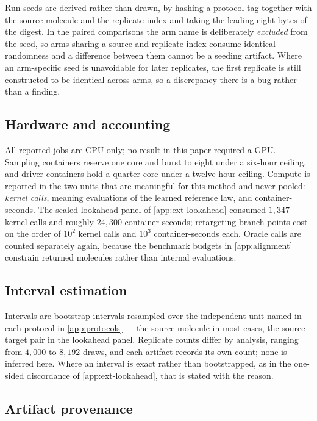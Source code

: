 Run seeds are derived rather than drawn, by hashing a protocol tag together with the source molecule and the replicate index and taking the leading eight bytes of the digest. In the paired comparisons the arm name is deliberately \emph{excluded} from the seed, so arms sharing a source and replicate index consume identical randomness and a difference between them cannot be a seeding artifact. Where an arm-specific seed is unavoidable for later replicates, the first replicate is still constructed to be identical across arms, so a discrepancy there is a bug rather than a finding.

\subsection{Hardware and accounting}

All reported jobs are CPU-only; no result in this paper required a GPU. Sampling containers reserve one core and burst to eight under a six-hour ceiling, and driver containers hold a quarter core under a twelve-hour ceiling. Compute is reported in the two units that are meaningful for this method and never pooled: \emph{kernel calls}, meaning evaluations of the learned reference law, and container-seconds. The sealed lookahead panel of \cref{app:ext-lookahead} consumed $1{,}347$ kernel calls and roughly $24{,}300$ container-seconds; retargeting branch points cost on the order of $10^2$ kernel calls and $10^3$ container-seconds each. Oracle calls are counted separately again, because the benchmark budgets in \cref{app:alignment} constrain returned molecules rather than internal evaluations.

\subsection{Interval estimation}

Intervals are bootstrap intervals resampled over the independent unit named in each protocol in \cref{app:protocols} --- the source molecule in most cases, the source--target pair in the lookahead panel. Replicate counts differ by analysis, ranging from $4{,}000$ to $8{,}192$ draws, and each artifact records its own count; none is inferred here. Where an interval is exact rather than bootstrapped, as in the one-sided discordance of \cref{app:ext-lookahead}, that is stated with the reason.

\subsection{Artifact provenance}

